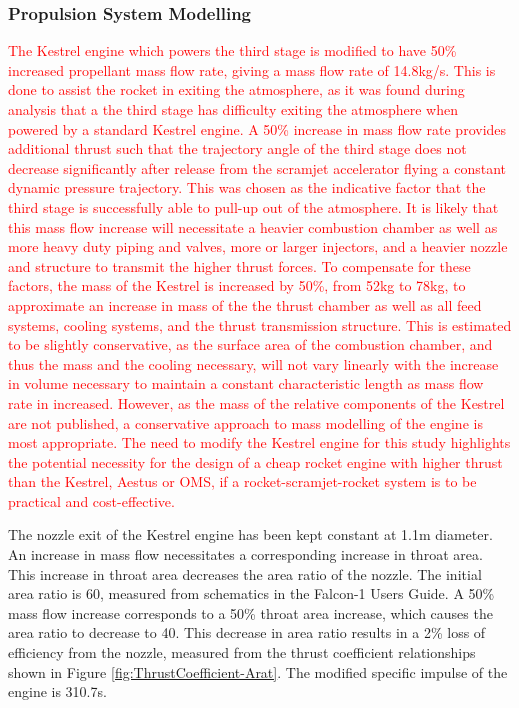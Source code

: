 		\subsubsection{Propulsion System Modelling}
			\textcolor{red}{
		The Kestrel engine which powers the third stage is modified to have 50\% increased propellant mass flow rate, giving a mass flow rate of 14.8kg/s. This is done to assist the rocket in exiting the atmosphere, as it was found during analysis that a the third stage has difficulty exiting the atmosphere when powered by a standard Kestrel engine. A 50\% increase in mass flow rate provides additional thrust such that the trajectory angle of the third stage does not decrease significantly after release from the scramjet accelerator flying a constant dynamic pressure trajectory. This was chosen as the indicative factor that the third stage is successfully able to pull-up out of the atmosphere. It is likely that this mass flow increase will necessitate a heavier combustion chamber as well as more heavy duty piping and valves, more or larger injectors, and a heavier nozzle and structure to transmit the higher thrust forces\cite{RPE,Huzel1967}. To compensate for these factors, the mass of the Kestrel is increased by 50\%, from 52kg\cite{Wade2017} to 78kg, to approximate an increase in mass of the the thrust chamber as well as all feed systems, cooling systems, and the thrust transmission structure. This is estimated to be slightly conservative, as the surface area of the combustion chamber, and thus the mass and the cooling necessary, will not vary linearly with the increase in volume necessary to maintain a constant characteristic length as mass flow rate in increased\cite{RPE,Huzel1967}. However, as the mass of the relative components of the Kestrel are not published, a conservative approach to mass modelling of the engine is most appropriate. The need to modify the Kestrel engine for this study highlights the potential necessity for the design of a cheap rocket engine with higher thrust than the Kestrel, Aestus or OMS, if a rocket-scramjet-rocket system is to be practical and cost-effective.}
		
		
		
		The nozzle exit of the Kestrel engine has been kept constant at 1.1m diameter. An increase in mass flow necessitates a corresponding increase in throat area. This increase in throat area decreases the area ratio of the nozzle. The initial area ratio is 60, measured from schematics in the Falcon-1 Users Guide. A 50\% mass flow increase corresponds to a 50\% throat area increase, which causes the area ratio to decrease to 40. This decrease in area ratio results in a 2\% loss of efficiency from the nozzle, measured from the thrust coefficient relationships shown in Figure \ref{fig:ThrustCoefficient-Arat}\cite{RPE}. The modified specific impulse of the engine is 310.7s. 
		
